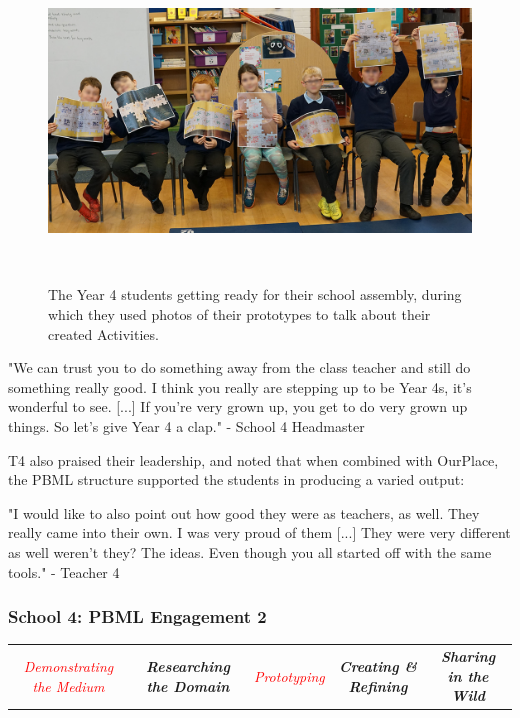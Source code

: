 \begin{figure}
\centering
  \includegraphics[width=0.8\columnwidth]{images/chapter08/assembly.jpg}
  \caption[Year 4 students hosting a school assembly to talk about their Activities]{The Year 4 students getting ready for their school assembly, during which they used photos of their prototypes to talk about their created Activities.}~\label{fig:Assembly}
\end{figure}

\begin{displayquote}
"We can trust you to do something away from the class teacher and still do something really good. I think you really are stepping up to be Year 4s, it's wonderful to see. [...] If you're very grown up, you get to do very grown up things. So let's give Year 4 a clap." - School 4 Headmaster
\end{displayquote}

T4 also praised their leadership, and noted that when combined with OurPlace, the PBML structure supported the students in producing a varied output:

\begin{displayquote}
"I would like to also point out how good they were as teachers, as well. They really came into their own. I was very proud of them [...] They were very different as well weren't they? The ideas. Even though you all started off with the same tools." - Teacher 4
\end{displayquote}

\subsubsection{School 4: PBML Engagement 2}

\begin{table}[h]
    \centering
    \begin{tabulary}{\textwidth}{C|C|p{19mm}|C|C}
    \small\textit{\textcolor{red}{Demonstrating the Medium}} 
    & \small\textit{\textbf{Researching the Domain}}
    & \small\textit{\textcolor{red}{Prototyping}}
    & \small\textit{\textbf{Creating \& Refining}}
    & \small\textit{\textbf{Sharing in the Wild}}\\
\end{tabulary}
\end{table}

